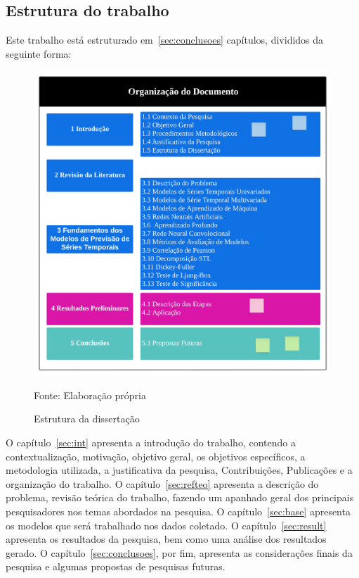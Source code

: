 \subsection{Estrutura do trabalho} \label{subsec:estrutura}
    Este trabalho está estruturado em~\ref{sec:conclusoes} capítulos, divididos da seguinte forma:
    
    \begin{figure}[H]
    	\centering
    	\caption{Estrutura da dissertação}
    	\label{fig:estrutura}
    	\includegraphics[width=0.7\linewidth]{Introducao/Figuras/Estrutura}
    	
    	Fonte: Elaboração própria 
    \end{figure}
        O capítulo~\ref{sec:int} apresenta a introdução do trabalho, contendo a contextualização, motivação, objetivo geral, os objetivos específicos, a metodologia utilizada, a justificativa da pesquisa, Contribuições, Publicações e a organização do trabalho.
        O capítulo~\ref{sec:refteo} apresenta a descrição do problema, revisão teórica do trabalho, fazendo um apanhado geral dos principais pesquisadores nos temas abordados na pesquisa.
        O capítulo~\ref{sec:base} apresenta os modelos que será trabalhado nos dados coletado.
        O capítulo~\ref{sec:result} apresenta os resultados da pesquisa, bem como uma análise dos resultados gerado.
        O capítulo~\ref{sec:conclusoes}, por fim, apresenta as considerações finais da pesquisa e algumas propostas de pesquisas futuras.